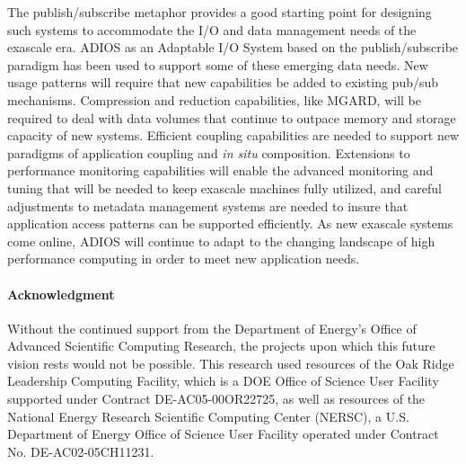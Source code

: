 The publish/subscribe metaphor provides a good starting point for designing such systems to accommodate the I/O and data management needs of the exascale era. ADIOS as an Adaptable I/O System based on the publish/subscribe paradigm has been used to support some of these emerging data needs.  New usage patterns will require that new capabilities be added to existing pub/sub mechanisms. Compression and reduction capabilities, like MGARD, will be required to deal with data volumes that continue to outpace memory and storage capacity of new systems. Efficient coupling capabilities are needed to support new paradigms of application coupling and \textit{in situ} composition. Extensions to performance monitoring capabilities will enable the advanced monitoring and tuning that will be needed to keep exascale machines fully utilized, and careful adjustments to metadata management systems are needed to insure that application access patterns can be supported efficiently. As new exascale systems come online, ADIOS will continue to adapt to the changing landscape of high performance computing in order to meet new application needs.



\paragraph*{Acknowledgment}
Without the continued support from the Department of Energy's Office of Advanced Scientific Computing Research, the projects upon which this future vision rests would not be possible. This research used resources of the Oak Ridge Leadership Computing Facility, which is a DOE Office of Science User Facility supported under Contract DE-AC05-00OR22725, as well as resources of the National Energy Research Scientific Computing Center (NERSC), a U.S. Department of Energy Office of Science User Facility operated under Contract No. DE-AC02-05CH11231.


